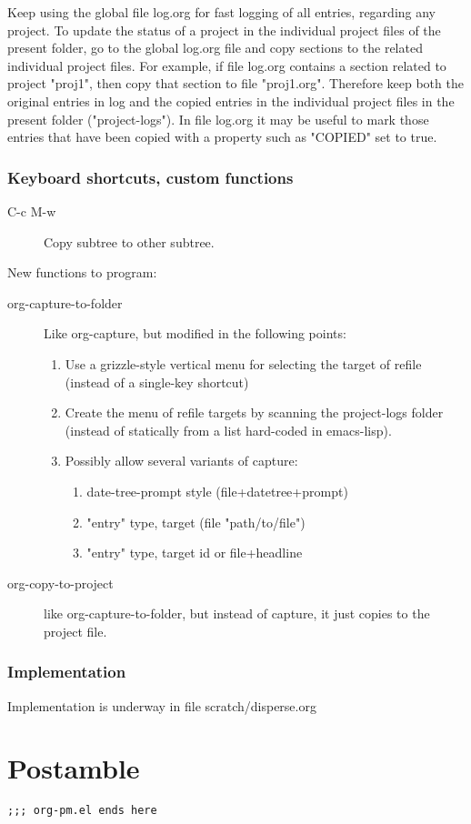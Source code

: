 \documentclass[nofonts]{tufte-handout}
\begin{document}
Keep using the global file log.org for fast logging of all entries, regarding any project.  To update the status of a project in the individual project files of the present folder, go to the global log.org file and copy sections to the related individual project files.  For example, if file log.org contains a section related to project "proj1", then copy that section to file "proj1.org".  Therefore keep both the original entries in log and the copied entries in the individual project files in the present folder ("project-logs").  In file log.org it may be useful to mark those entries that have been copied with a property such as "COPIED" set to true.

\subsubsection{Keyboard shortcuts, custom functions}
\label{sec-5-2-3}

\begin{description}
\item[{C-c M-w}] Copy subtree to other subtree.
\end{description}

New functions to program:

\begin{description}
\item[{org-capture-to-folder}] Like org-capture, but modified in the following points:
\begin{enumerate}
\item Use a grizzle-style vertical menu for selecting the target of refile (instead of a single-key shortcut)
\item Create the menu of refile targets by scanning the project-logs folder (instead of statically from a list hard-coded in emacs-lisp).
\item Possibly allow several variants of capture:
\begin{enumerate}
\item date-tree-prompt style (file+datetree+prompt)
\item "entry" type, target (file "path/to/file")
\item "entry" type, target id or file+headline
\end{enumerate}
\end{enumerate}
\item[{org-copy-to-project}] like org-capture-to-folder, but instead of capture, it just copies to the project file.
\end{description}

\subsubsection{Implementation}
\label{sec-5-2-4}

Implementation is underway in file scratch/disperse.org

\section{Postamble}
\label{sec-6}

\begin{verbatim}
;;; org-pm.el ends here
\end{verbatim}
\end{document}
